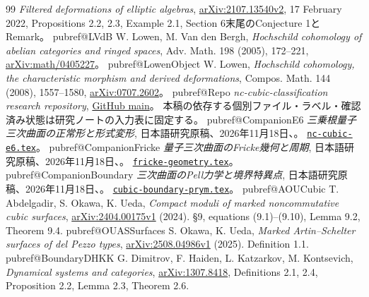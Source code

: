 \begin{thebibliography}{99}
\emph{Filtered deformations of elliptic algebras},
\href{https://arxiv.org/abs/2107.13540v2}{arXiv:2107.13540v2}, 17 February 2022,
Propositions 2.2, 2.3, Example 2.1, Section 6末尾のConjecture 1とRemark。
\fi
\ifcsname pubref@LVdB\endcsname
{} W. Lowen, M. Van den Bergh,
\emph{Hochschild cohomology of abelian categories and ringed spaces},
Adv. Math. 198 (2005), 172--221,
\href{https://arxiv.org/abs/math/0405227}{arXiv:math/0405227}。
\fi
\ifcsname pubref@LowenObject\endcsname
{} W. Lowen,
\emph{Hochschild cohomology, the characteristic morphism and derived deformations},
Compos. Math. 144 (2008), 1557--1580,
\href{https://arxiv.org/abs/0707.2602}{arXiv:0707.2602}。
\fi
\ifcsname pubref@Repo\endcsname
{} \emph{nc-cubic-classification research repository},
\href{https://github.com/uedakazushi/nc-cubic-classification}{GitHub main}。
本稿の依存する個別ファイル・ラベル・確認済み状態は研究ノートの入力表に固定する。
\fi
\ifcsname pubref@CompanionE6\endcsname
{}\emph{三乗根量子三次曲面の正常形と形式変形},
日本語研究原稿、2026年11月18日、\PublicationVersion。
\href{https://github.com/uedakazushi/nc-cubic-e6/blob/main/papers/nc-cubic-e6.tex}{\texttt{nc-cubic-e6.tex}}。
\fi
\ifcsname pubref@CompanionFricke\endcsname
{}\emph{量子三次曲面のFricke幾何と周期},
日本語研究原稿、2026年11月18日、\PublicationVersion。
\href{https://github.com/uedakazushi/nc-cubic-e6/blob/main/papers/fricke-geometry.tex}{\texttt{fricke-geometry.tex}}。
\fi
\ifcsname pubref@CompanionBoundary\endcsname
{}\emph{三次曲面のPell力学と境界特異点},
日本語研究原稿、2026年11月18日、\PublicationVersion。
\href{https://github.com/uedakazushi/nc-cubic-e6/blob/main/papers/cubic-boundary-prym.tex}{\texttt{cubic-boundary-prym.tex}}。
\fi
\ifcsname pubref@AOUCubic\endcsname
{}
T. Abdelgadir, S. Okawa, K. Ueda,
\emph{Compact moduli of marked noncommutative cubic surfaces},
\href{https://arxiv.org/abs/2404.00175v1}{arXiv:2404.00175v1} (2024).
\S9, equations (9.1)--(9.10), Lemma 9.2, Theorem 9.4.
\fi
\ifcsname pubref@OUASSurfaces\endcsname
{}
S. Okawa, K. Ueda,
\emph{Marked Artin--Schelter surfaces of del Pezzo types},
\href{https://arxiv.org/abs/2508.04986v1}{arXiv:2508.04986v1} (2025).
Definition 1.1.
\fi
\ifcsname pubref@BoundaryDHKK\endcsname
{} G. Dimitrov, F. Haiden, L. Katzarkov, M. Kontsevich,
\emph{Dynamical systems and categories},
\href{https://arxiv.org/abs/1307.8418}{arXiv:1307.8418},
Definitions 2.1, 2.4, Proposition 2.2, Lemma 2.3, Theorem 2.6.

\end{thebibliography}
